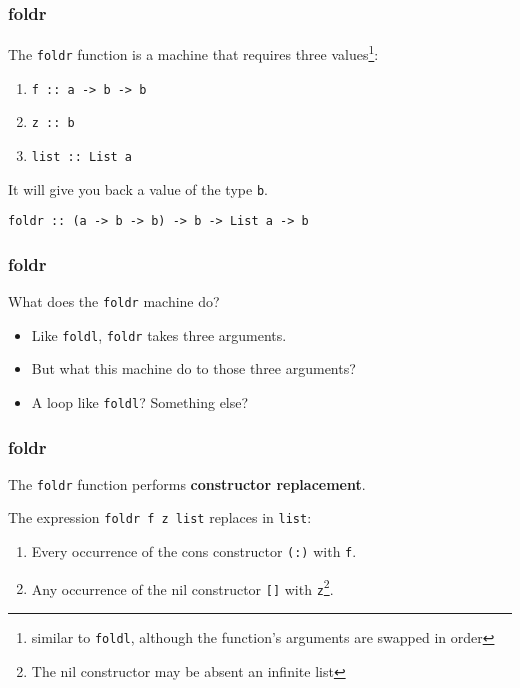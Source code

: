 \begin{frame}
\frametitle{foldr}

The \lstinline[basicstyle=\ttfamily]$foldr$ function is a machine that requires three values\footnote{similar to \lstinline[basicstyle=\ttfamily]$foldl$, although the function's arguments are swapped in order}:
\begin{enumerate}
\item \lstinline[basicstyle=\ttfamily]$f :: a -> b -> b$
\item \lstinline[basicstyle=\ttfamily]$z :: b$
\item \lstinline[basicstyle=\ttfamily]$list :: List a$
\end{enumerate}

It will give you back a value of the type \lstinline[basicstyle=\ttfamily]$b$.

\hrulefill

\lstinline[basicstyle=\ttfamily]$foldr :: (a -> b -> b) -> b -> List a -> b$

\end{frame}


\begin{frame}
\frametitle{foldr}

\begin{block}{What does the \lstinline[basicstyle=\ttfamily]$foldr$ machine do?}

\begin{itemize}
\item Like \lstinline[basicstyle=\ttfamily]$foldl$, \lstinline[basicstyle=\ttfamily]$foldr$ takes three arguments.
\item But what this machine do to those three arguments?
\item A loop like \lstinline[basicstyle=\ttfamily]$foldl$? Something else?
\end{itemize}

\end{block}

\end{frame}


\begin{frame}
\frametitle{foldr}

\begin{block}

The \lstinline[basicstyle=\ttfamily]$foldr$ function performs \textbf{constructor replacement}.

\end{block}

The expression \lstinline[basicstyle=\ttfamily]$foldr f z list$ replaces in \lstinline[basicstyle=\ttfamily]$list$:
\begin{enumerate}
\item Every occurrence of the cons constructor \lstinline[basicstyle=\ttfamily]$(:)$ with \lstinline[basicstyle=\ttfamily]$f$.
\item Any occurrence of the nil constructor \lstinline[basicstyle=\ttfamily]$[]$ with \lstinline[basicstyle=\ttfamily]$z$\footnote{The nil constructor may be absent \textemdash an infinite list}.
\end{enumerate}

\end{frame}



